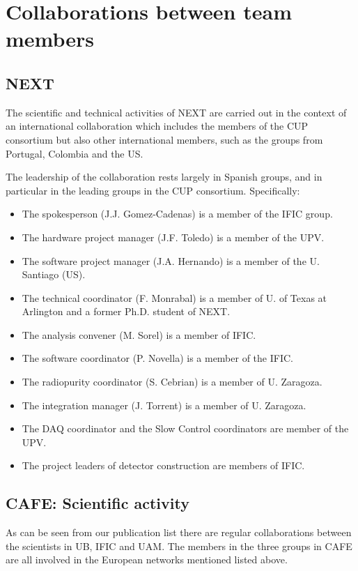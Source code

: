 \documentclass[a4paper,11pt,oneside]{article}
\begin{document}
\section{\bf \textsf{Collaborations between team members}}

\subsection*{NEXT}

The scientific and technical activities of NEXT are carried out in the context of an international collaboration which includes the members of the CUP consortium but also other international members, such as the groups from Portugal, Colombia and the US. 

The leadership of the collaboration rests largely in Spanish groups, and in particular in the leading groups in the CUP consortium. Specifically:

\begin{itemize}
\item The spokesperson (J.J. Gomez-Cadenas) is a member of the IFIC group.
\item The hardware project manager (J.F. Toledo) is a member of the UPV.
\item The software project manager (J.A. Hernando) is a member of the U. Santiago (US).
\item The technical coordinator (F. Monrabal) is a member of U. of Texas at Arlington and a former Ph.D. student of NEXT.
\item The analysis convener (M. Sorel) is a member of IFIC.
\item The software coordinator (P. Novella) is a member of the IFIC. 
\item The radiopurity coordinator (S. Cebrian) is a member of U. Zaragoza.
\item The integration manager (J. Torrent) is a member of U. Zaragoza.
\item The DAQ coordinator and the Slow Control coordinators are member of the UPV.
\item The project leaders of detector construction are members of IFIC.
\end{itemize}


\subsection*{CAFE: Scientific activity}

As can be seen from our publication list there are regular
collaborations between the scientists in UB, IFIC and UAM. 
The members in the three groups in CAFE are all involved in the European
networks mentioned listed above. 
\end{document}
